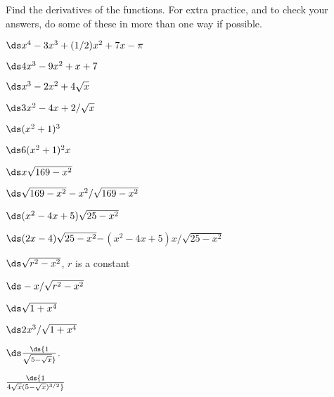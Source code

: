 \begin{exercises}

Find the derivatives of the functions. For extra practice, and to
check your answers, do some of these in more than one way if
possible. 

\twocol

\begin{exercise} $\ds x^4-3x^3+(1/2)x^2+7x-\pi$
\begin{answer} $\ds 4x^3-9x^2+x+7$
\end{answer}\end{exercise}

\begin{exercise} $\ds x^3-2x^2+4\sqrt{x}$
\begin{answer} $\ds 3x^2-4x+2/\sqrt{x}$
\end{answer}\end{exercise}

\begin{exercise} $\ds (x^2+1)^3$
\begin{answer} $\ds 6(x^2+1)^2x$
\end{answer}\end{exercise}

\begin{exercise} $\ds x\sqrt{169-x^2}$
\begin{answer} $\ds \sqrt{169-x^2}-x^2/\sqrt{169-x^2}$
\end{answer}\end{exercise}

\begin{exercise} $\ds (x^2-4x+5)\sqrt{25-x^2}$
\begin{answer} $\ds  (2x-4)\sqrt{25-x^2}-$\hfill\break$(x^2-4x+5)x/\sqrt{25-x^2}$
\end{answer}\end{exercise}

\begin{exercise} $\ds \sqrt{r^2-x^2}$, $r$ is a constant
\begin{answer} $\ds -x/\sqrt{r^2-x^2}$
\end{answer}\end{exercise}

\begin{exercise} $\ds \sqrt{1+x^4}$
\begin{answer} $\ds 2x^3/\sqrt{1+x^4}$
\end{answer}\end{exercise}

\begin{exercise} $\ds \ds{1\over\sqrt{5-\sqrt{x}}}$.
\begin{answer} $\ds{1\over 4\sqrt{x}(5-\sqrt{x})^{3/2}}$
\end{answer}\end{exercise}


\end{exercises}
